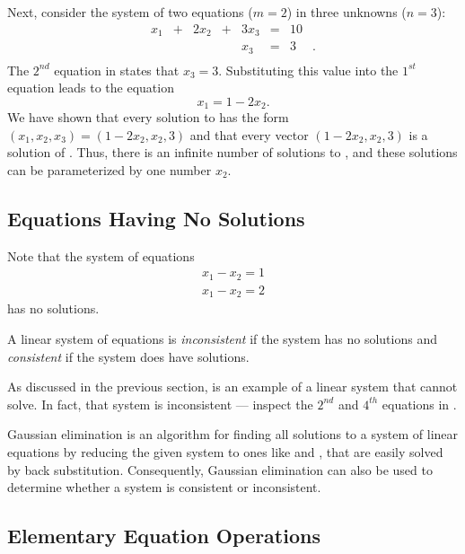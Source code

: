 \documentclass{ximera}
\begin{document}
Next, consider the system of two equations ($m=2$) in three
unknowns ($n=3$):
\begin{equation}  \label{e23}
\begin{array}{rcrcrcrl}
  x_1 & + & 2x_2 & + & 3x_3 & = &  10  & \\
      &   &      &   &  x_3 & = &   3  & \! . \\
\end{array}
\end{equation}
The $2^{nd}$ equation in  states that $x_3=3$.
Substituting
this value into the $1^{st}$ equation leads to the equation
\[
x_1 = 1-2x_2.
\]
We have shown that every solution to  has the form
$(x_1,x_2,x_3)=(1-2x_2,x_2,3)$ and that every vector
$(1-2x_2,x_2,3)$ is a solution of .  Thus, there is an
infinite number of solutions to , and these solutions
can be parameterized by one number $x_2$.

\subsection*{Equations Having No Solutions}

Note that the system of equations
\begin{eqnarray*}
x_1 - x_2 = 1\\
x_1 - x_2 = 2
\end{eqnarray*}
has no solutions.

\begin{Def}
A linear system of equations is {\em inconsistent\/} if the
system has no solutions and {\em consistent\/} if the system
does have solutions.
\end{Def}  

As discussed in the previous section,  is an example
of a linear system that \Matlab cannot solve.  In fact, that
system is inconsistent --- inspect the $2^{nd}$ and $4^{th}$
equations in .

Gaussian elimination is an algorithm for finding all solutions
to a system of linear equations by reducing the given system to
ones like  and , that are easily solved by
back substitution.  Consequently, Gaussian elimination can also be
used to determine whether a system is consistent or inconsistent.

\subsection*{Elementary Equation Operations}
\end{document}
